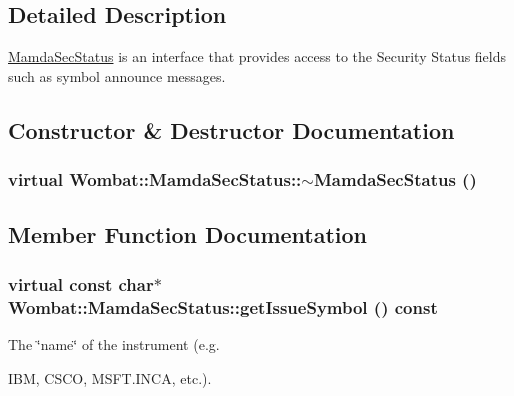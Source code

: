 \subsection{Detailed Description}
\hyperlink{classWombat_1_1MamdaSecStatus}{Mamda\-Sec\-Status} is an interface that provides access to the Security Status fields such as symbol announce messages. 



\subsection{Constructor \& Destructor Documentation}
\hypertarget{classWombat_1_1MamdaSecStatus_3f313250bbdadba09d0d963349e40bb8}{
\subsubsection[$\sim$MamdaSecStatus]{\setlength{\rightskip}{0pt plus 5cm}virtual Wombat::Mamda\-Sec\-Status::$\sim$Mamda\-Sec\-Status ()}}
\label{classWombat_1_1MamdaSecStatus_3f313250bbdadba09d0d963349e40bb8}




\subsection{Member Function Documentation}
\hypertarget{classWombat_1_1MamdaSecStatus_40ee188d2918841022327263a2b27fcd}{
\subsubsection[getIssueSymbol]{\setlength{\rightskip}{0pt plus 5cm}virtual const char$\ast$ Wombat::Mamda\-Sec\-Status::get\-Issue\-Symbol () const}}
\label{classWombat_1_1MamdaSecStatus_40ee188d2918841022327263a2b27fcd}


The \char`\"{}name\char`\"{} of the instrument (e.g. 

IBM, CSCO, MSFT.INCA, etc.).


